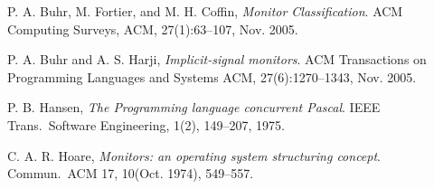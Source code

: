 \documentclass[preprint]{sigplanconf}
\begin{document}
%
%
%
%
%
%
%
%
\begin{thebibliography}{}
\softraggedright

  P. A. Buhr, M. Fortier, and M. H. Coffin, \emph{Monitor Classification}. ACM 
  Computing Surveys, ACM, 27(1):63--107, 
  Nov. 2005.
  
  P. A. Buhr and A. S. Harji, \emph{Implicit-signal monitors}. ACM 
  Transactions on Programming Languages and Systems ACM, 27(6):1270--1343, 
  Nov. 2005.

  P. B. Hansen, \emph{The Programming language concurrent Pascal}. IEEE
  Trans.~Software Engineering, 1(2), 149--207, 1975.

  C. A. R. Hoare, \emph{Monitors: an operating system structuring concept}. 
  Commun.~ACM 17, 10(Oct. 1974), 549--557.



\end{thebibliography}
\end{document}

